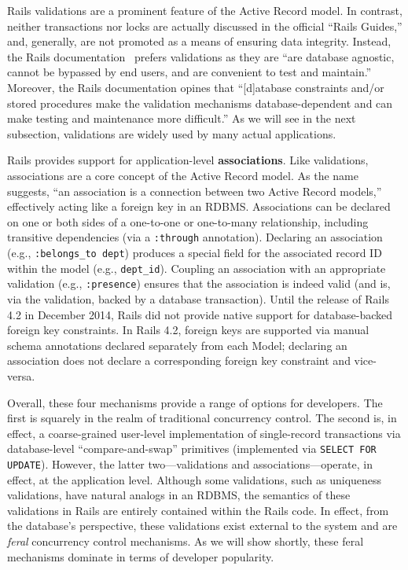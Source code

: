\begin{myenumerate}
  Rails validations are a prominent feature of the Active Record
  model. In contrast, neither transactions nor locks are actually
  discussed in the official ``Rails Guides,'' and, generally, are not
  promoted as a means of ensuring data integrity. Instead, the Rails
  documentation~\cite{rails-guide} prefers validations as they are
  ``are database agnostic, cannot be bypassed by end users, and are
  convenient to test and maintain.'' Moreover, the Rails documentation
  opines that ``[d]atabase constraints and/or stored procedures make
  the validation mechanisms database-dependent and can make testing
  and maintenance more difficult.'' As we will see in the next
  subsection, validations are widely used by many actual applications.

\item Rails provides support for application-level
  \textbf{associations}. Like validations, associations are a core
  concept of the Active Record model. As the name suggests, ``an
  association is a connection between two Active Record models,''
  effectively acting like a foreign key in an RDBMS. Associations can
  be declared on one or both sides of a one-to-one or one-to-many
  relationship, including transitive dependencies (via a
  \texttt{:through} annotation). Declaring an association (e.g.,
  \texttt{:belongs\_to dept}) produces a special field for the
  associated record ID within the model (e.g.,
  \texttt{dept\_id}). Coupling an association with an appropriate
  validation (e.g., \texttt{:presence}) ensures that the association
  is indeed valid (and is, via the validation, backed by a database
  transaction). Until the release of Rails 4.2 in December 2014, Rails
  did not provide native support for database-backed foreign key
  constraints. In Rails 4.2, foreign keys are supported via manual
  schema annotations declared separately from each Model; declaring an
  association does not declare a corresponding foreign key constraint
  and vice-versa.
\end{myenumerate}

Overall, these four mechanisms provide a range of options for
developers. The first is squarely in the realm of traditional
concurrency control. The second is, in effect, a coarse-grained
user-level implementation of single-record transactions via
database-level ``compare-and-swap'' primitives (implemented via
\texttt{SELECT FOR UPDATE}). However, the latter two---validations and
associations---operate, in effect, at the application level. Although
some validations, such as uniqueness validations, have natural analogs
in an RDBMS, the semantics of these validations in Rails are entirely
contained within the Rails code. In effect, from the database's
perspective, these validations exist external to the system and are
\textit{feral} concurrency control mechanisms. As we will show
shortly, these feral mechanisms dominate in terms of developer
popularity.

